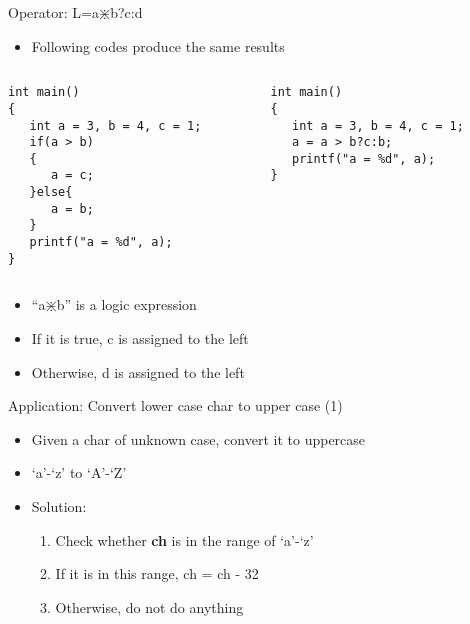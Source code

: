 \begin{frame}[fragile]{Operator: L=a$\divideontimes$b?c:d}
\begin{itemize}
	\item {Following codes produce the same results}
\end{itemize}
\vspace{-0.15in}
\begin{columns}
\begin{column}{0.48\linewidth}
\begin{lstlisting}[xleftmargin=0.05\linewidth]
int main()
{  
   int a = 3, b = 4, c = 1;
   if(a > b)
   {
      a = c;
   }else{
      a = b;
   }
   printf("a = %d", a);
}
\end{lstlisting}
\end{column}
\begin{column}{0.48\linewidth}
\begin{lstlisting}[xleftmargin=0.05\linewidth]
int main()
{  
   int a = 3, b = 4, c = 1;
   a = a > b?c:b;
   printf("a = %d", a);
}
\end{lstlisting}
\end{column}
\end{columns}
\vspace{-0.1in}
\begin{itemize}
	\item {``a$\divideontimes$b'' is a logic expression}
	\item {If it is true, c is assigned to the left}
	\item {Otherwise, d is assigned to the left}
\end{itemize}
\end{frame}

\begin{frame}[fragile]{Application: Convert lower case char to upper case (1)}
\begin{itemize}
	\item {Given a char of unknown case,  convert it to uppercase}
	\item {`a'-`z' to `A'-`Z'}
	\item {Solution:}
	\begin{enumerate}
		\item {Check whether \textbf{ch} is in the range of `a'-`z'}
		\item {If it is in this range, ch = ch - 32}
		\item {Otherwise, do not do anything}
	\end{enumerate}
\end{itemize}
\end{frame}

